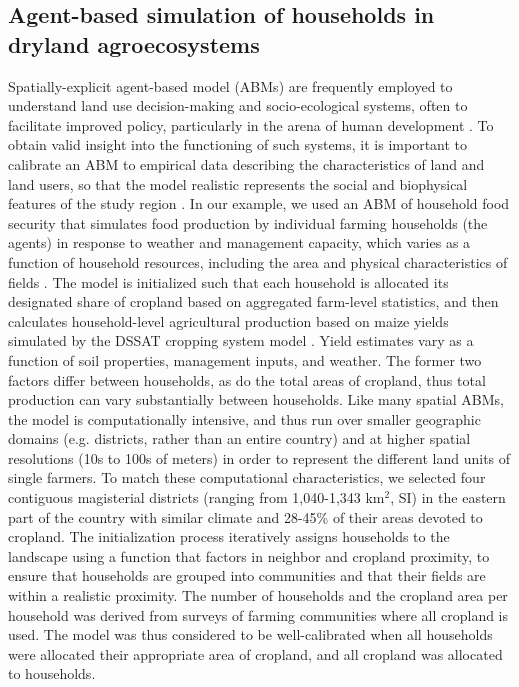 \documentclass{pnastwo}
\begin{document}
\begin{article}
\subsection{Agent-based simulation of households in dryland agroecosystems}
Spatially-explicit agent-based model (ABMs) are frequently employed to understand land use decision-making and socio-ecological systems, often to facilitate improved policy, particularly in the arena of human development \cite{berger_creating_2006}. To obtain valid insight into the functioning of such systems, it is important to calibrate an ABM to empirical data describing the characteristics of land and land users, so that the model realistic represents the social and biophysical features of the study region \cite{berger_creating_2006}. In our example, we used an ABM of household food security that simulates food production by individual farming households (the agents) in response to weather and management capacity, which varies as a function of household resources, including the area and physical characteristics of fields \cite{chen_dependency_2013}. The model is initialized such that each household is allocated its designated share of cropland based on aggregated farm-level statistics, and then calculates household-level agricultural production based on maize yields simulated by the DSSAT cropping system model \cite{jones_modelling_2003}. Yield estimates vary as a function of soil properties, management inputs, and weather. The former two factors differ between households, as do the total areas of cropland, thus total production can vary substantially between households. Like many spatial ABMs, the model is computationally intensive, and thus run over smaller geographic domains (e.g. districts, rather than an entire country) and at higher spatial resolutions (10s to 100s of meters) in order to represent the different land units of single farmers. To match these computational characteristics, we selected four contiguous magisterial districts (ranging from 1,040-1,343 km$^2$, SI) in the eastern part of the country with similar climate and 28-45\% of their areas devoted to cropland. The initialization process iteratively assigns households to the landscape using a function that factors in neighbor and cropland proximity, to ensure that households are grouped into communities and that their fields are within a realistic proximity. The number of households and the cropland area per household was derived from surveys of farming communities where all cropland is used. The model was thus considered to be well-calibrated when all households were allocated their appropriate area of cropland, and all cropland was allocated to households. 


\end{article}
\end{document}
